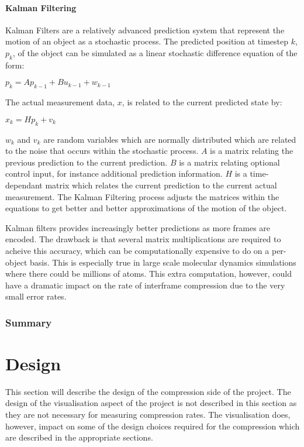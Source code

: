 \documentclass[a4paper,11pt]{report}
\begin{document}
\subsubsection*{Kalman Filtering}

Kalman Filters are a relatively advanced prediction system that represent the motion of an object as a stochastic process.\cite{welch1995ikf} The predicted position at timestep $k$, $p_k$, of the object can be simulated as a linear stochastic difference equation of the form:
\begin{center} $p_k = Ap_{k-1} + Bu_{k-1} + w_{k-1}$  \end{center}
The actual measurement data, $x$, is related to the current predicted state by:
\begin{center} $x_k = Hp_k + v_k$ \end{center}
$w_k$ and $v_k$ are random variables which are normally distributed which are related to the noise that occurs within the stochastic process. $A$ is a matrix relating the previous prediction to the current prediction. $B$ is a matrix relating optional control input, for instance additional prediction information. $H$ is a time-dependant matrix which relates the current prediction to the current actual measurement. The Kalman Filtering process adjusts the matrices within the equations to get better and better approximations of the motion of the object.

Kalman filters provides increasingly better predictions as more frames are encoded. The drawback is that several matrix multiplications are required to acheive this accuracy, which can be computationally expensive to do on a per-object basis. This is especially true in large scale molecular dynamics simulations where there could be millions of atoms. This extra computation, however, could have a dramatic impact on the rate of interframe compression due to the very small error rates.

\subsection{Summary}



\chapter{Design}



This section will describe the design of the compression side of the project. The design of the visualisation aspect of the project is not described in this section as they are not necessary for measuring compression rates. The visualisation does, however, impact on some of the design choices required for the compression which are described in the appropriate sections.
\end{document}
